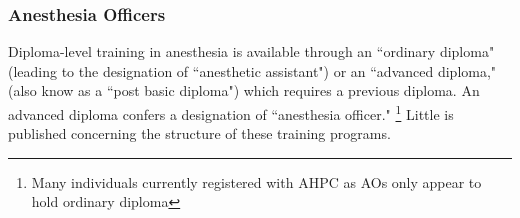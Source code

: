 \documentclass[12pt]{article} %
\begin{document}
\subsubsection{Anesthesia Officers}

Diploma-level training in anesthesia is available through an ``ordinary diploma" (leading to the designation of ``anesthetic assistant") or an ``advanced diploma," (also know as a ``post basic diploma") which requires a previous diploma. An advanced diploma confers a designation of ``anesthesia officer." 
\footnote{Many individuals currently registered with AHPC as AOs only appear to hold ordinary diploma}
\cite{dsco2012}
Little is published concerning the structure of these training programs.
\end{document}
